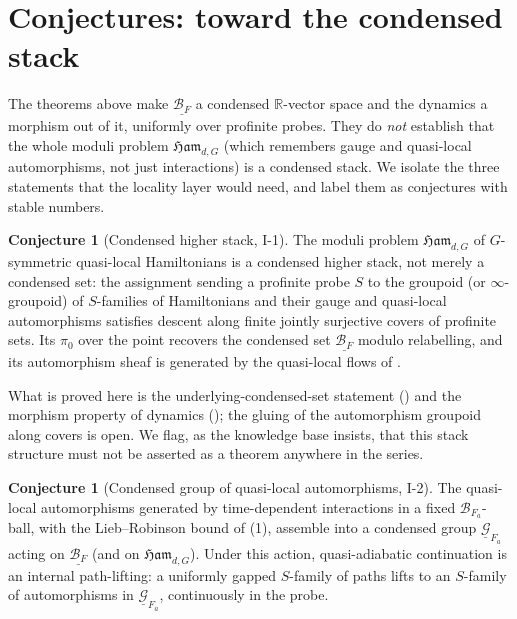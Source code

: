 \documentclass[12pt]{article}
\newcommand{\cond}[1]{\underline{#1}}          %
\newcommand{\Ffun}{F}                          %
\newcommand{\BF}{\mathcal{B}_{F}}              %
\newcommand{\Ham}{\mathfrak{Ham}}              %
\newcommand{\R}{\mathbb{R}}
\theoremstyle{definition}
\newtheorem{conjecture}[theorem]{Conjecture}
\theoremstyle{remark}
\begin{document}
\section{Conjectures: toward the condensed stack}
\label{sec:conjectures}

The theorems above make $\cond{\BF}$ a condensed $\R$-vector space and the dynamics a
morphism out of it, uniformly over profinite probes. They do \emph{not} establish that the
whole moduli problem $\Ham_{d,G}$ (which remembers gauge and quasi-local automorphisms, not
just interactions) is a condensed stack. We isolate the three statements that the
locality layer would need, and label them as conjectures with stable numbers.

\begin{conjecture}[Condensed higher stack, I-1]
\label{conj:stack}
The moduli problem $\Ham_{d,G}$ of $G$-symmetric quasi-local Hamiltonians is a condensed
higher stack, not merely a condensed set: the assignment sending a profinite probe $S$ to the
groupoid (or $\infty$-groupoid) of $S$-families of Hamiltonians and their gauge and
quasi-local automorphisms satisfies descent along finite jointly surjective covers of profinite
sets. Its $\pi_0$ over the point recovers the condensed set $\cond{\BF}$ modulo relabelling,
and its automorphism sheaf is generated by the quasi-local flows of .
\end{conjecture}

What is proved here is the underlying-condensed-set statement () and
the morphism property of dynamics (); the gluing of the
automorphism groupoid along covers is open. We flag, as the knowledge base insists, that this
stack structure must not be asserted as a theorem anywhere in the series.

\begin{conjecture}[Condensed group of quasi-local automorphisms, I-2]
\label{conj:group}
The quasi-local automorphisms generated by time-dependent interactions in a fixed
$\mathcal B_{\Ffun_a}$-ball, with the Lieb--Robinson bound of (1), assemble
into a condensed group $\underline{\mathcal G}_{\Ffun_a}$ acting on $\cond{\BF}$ (and on
$\Ham_{d,G}$). Under this action, quasi-adiabatic continuation is an internal path-lifting:
a uniformly gapped $S$-family of paths lifts to an $S$-family of automorphisms in
$\underline{\mathcal G}_{\Ffun_a}$, continuously in the probe.
\end{conjecture}
\end{document}
